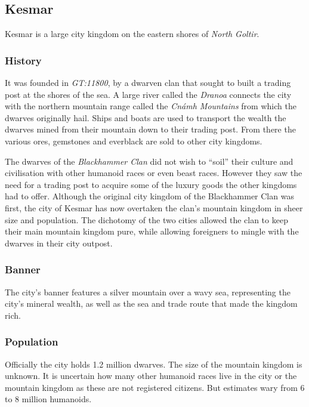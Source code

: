 \subsection{Kesmar}
\label{sec:Kesmar}

Kesmar is a large city kingdom on the eastern shores of \emph{North Goltir}.

\subsubsection*{History}

It was founded in \emph{GT:11800}, by a dwarven clan that sought to built a
trading post at the shores of the sea. A large river called the \emph{Dranoa}
connects the city with the northern mountain range called the
\emph{Cnámh Mountains} from which the dwarves originally hail. Ships and
boats are used to transport the wealth the dwarves mined from their mountain
down to their trading post. From there the various ores, gemstones and everblack
are sold to other city kingdoms.

The dwarves of the \emph{Blackhammer Clan} did not wish to ``soil'' their
culture and civilisation with other humanoid races or even beast
races. However they saw the need for a trading post to acquire some of the
luxury goods the other kingdoms had to offer. Although the original city
kingdom of the Blackhammer Clan was first, the city of Kesmar has now
overtaken the clan's mountain kingdom in sheer size and population. The
dichotomy of the two cities allowed the clan to keep their main mountain
kingdom pure, while allowing foreigners to mingle with the dwarves in their
city outpost.

\subsubsection*{Banner}

The city's banner features a silver mountain over a wavy sea, representing the
city's mineral wealth, as well as the sea and trade route that made the
kingdom rich.

\subsubsection*{Population}

Officially the city holds 1.2 million dwarves. The size of the mountain
kingdom is unknown. It is uncertain how many other humanoid races live in
the city or the mountain kingdom as these are not registered citizens. But
estimates wary from 6 to 8 million humanoids.

